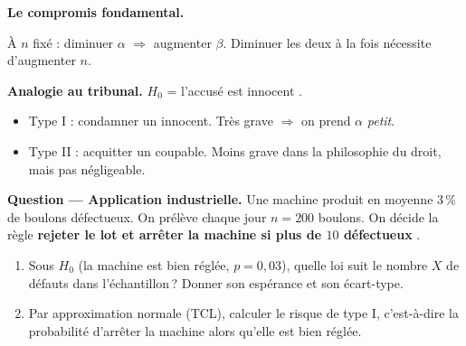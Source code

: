 \medskip

\textbf{Le compromis fondamental.}

\begin{center}
\begin{mdframed}[backgroundcolor=ThemeLight, linecolor=Theme,
  linewidth=1pt, innertopmargin=8pt, innerbottommargin=8pt]
À $n$ fixé : \;diminuer $\alpha$ $\Longrightarrow$ augmenter $\beta$. \;Diminuer les deux à la fois nécessite d'augmenter $n$.
\end{mdframed}
\end{center}

\medskip

\textbf{Analogie au tribunal.} $H_0$ = \og l'accusé est innocent \fg{}.
\begin{itemize}
  \item Type I : condamner un innocent. Très grave $\Longrightarrow$ on prend $\alpha$ \emph{petit}.
  \item Type II : acquitter un coupable. Moins grave dans la philosophie du droit, mais pas négligeable.
\end{itemize}

\medskip

\textbf{Question --- Application industrielle.}
Une machine produit en moyenne $3\,\%$ de boulons défectueux. On prélève chaque jour $n=200$ boulons. On décide la règle \og \textbf{rejeter le lot et arrêter la machine si plus de $10$ défectueux} \fg.
\begin{enumerate}
  \item Sous $H_0$ (la machine est bien réglée, $p = 0{,}03$), quelle loi suit le nombre $X$ de défauts dans l'échantillon\,? Donner son espérance et son écart-type.
  \item Par approximation normale (TCL), calculer le risque de type I, c'est-à-dire la probabilité d'arrêter la machine alors qu'elle est bien réglée.
\end{enumerate}


